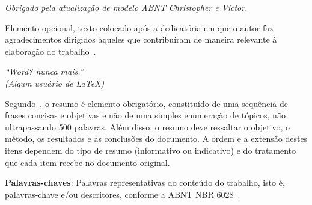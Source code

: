 \documentclass[
	12pt,				    %
	openright,			    %
	oneside,			    %
	a4paper,			    %
    sumario=tradicional,        %
	english,			    %
	brazil,				    %
 ]{abntex2}
\begin{document}
\frenchspacing

\pretextual

\imprimircapa

\imprimirfolhaderosto

\imprimirfolhadeaprovacao

\begin{dedicatoria}
    \vspace*{{\fill}}
	\begin{flushright}
		\textit{Obrigado pela atualização de modelo ABNT Christopher e Victor.}
	\end{flushright}
    \vspace*{2cm}

\end{dedicatoria}

\begin{agradecimentos}
Elemento opcional, texto colocado ap\'os a dedicat\'oria em que o autor faz agradecimentos dirigidos àqueles que contribuíram de maneira relevante à elaboração do trabalho~\cite{NBR14724:2011}.
\end{agradecimentos}

\begin{epigrafe}
    \vspace*{\fill}
	\begin{flushright}
		\textit{``Word? nunca mais.''\\
		(Algum usuário de \LaTeX)}
	\end{flushright}
    \vspace*{2cm}
\end{epigrafe}


\begin{resumo}
    \noindent
    Segundo~, o resumo é elemento obrigatório, constituído de uma sequência de frases concisas e objetivas e n\~ao de uma simples enumeração de tópicos, não ultrapassando 500 palavras. Além disso, o resumo deve ressaltar o objetivo, o método, os resultados e as conclusões do documento. A ordem e a extensão destes itens dependem do tipo de resumo (informativo ou indicativo) e do tratamento que cada item recebe no documento original.
    \vspace{\onelineskip}

    \noindent
    \textbf{Palavras-chaves}: Palavras representativas do conteúdo do trabalho, isto é, palavras-chave e/ou descritores, conforme a ABNT NBR 6028~\cite{NBR6028:2003}.
\end{resumo}
\end{document}
